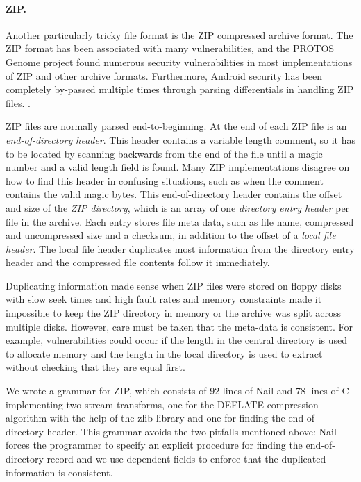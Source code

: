 \paragraph{ZIP.}

Another particularly tricky file format is the ZIP compressed archive format\cite{pkzip}. The ZIP
format has been associated with many vulnerabilities, and the PROTOS Genome project found numerous
security vulnerabilities in most implementations of ZIP and other archive formats. Furthermore,
Android security has been completely by-passed multiple times through parsing differentials in
handling ZIP files\cite{saurik-masterkey}. . 

ZIP files are normally parsed end-to-beginning. At the end of each ZIP file is an \emph{end-of-directory
header}. This header contains a variable length comment, so it has to be located by scanning
backwards from the end of the file until a magic number and a valid length field is found. Many ZIP
implementations disagree on how to find this header in confusing situations, such as when the
comment contains the valid magic bytes\cite{wolf-berlinsides-zip}.
This end-of-directory header contains the offset and size of the \emph{ZIP directory}, which is an
array of one \emph{directory entry header} per file in the archive.
Each entry stores file meta data, such as file name, compressed and uncompressed size and a checksum,
in addition to the offset of a \emph{local file header}. The local file header duplicates most
information from the directory entry header and the compressed file contents follow it immediately.

Duplicating information made sense when ZIP files were
stored on floppy disks with slow seek times and high fault rates and memory constraints made it
impossible to keep the ZIP directory in memory or the archive was split across multiple disks.
However, care must be taken that the meta-data is consistent. For example, vulnerabilities could occur
if the length in the central directory is used to allocate memory and the length in the local
directory is used to extract without checking that they are equal first.

\XXX[condense]

We wrote a grammar for ZIP, which consists of 92 lines of Nail and 78 lines of C implementing two
stream transforms, one for the DEFLATE compression algorithm with the help of the zlib library and
one for finding the end-of-directory header. This grammar avoids the two pitfalls mentioned above:
Nail forces the programmer to specify an explicit procedure for finding the end-of-directory record
and we use dependent fields to enforce that the duplicated information is consistent.


